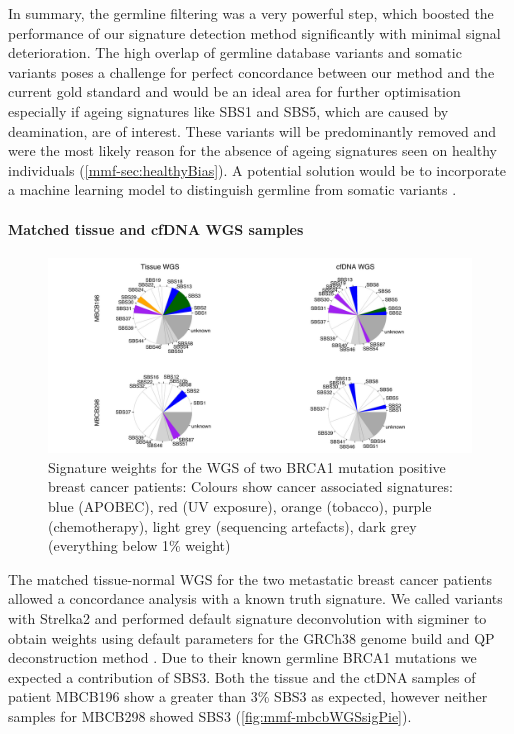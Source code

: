 In summary, the germline filtering was a very powerful step, which boosted the performance of our signature detection method significantly with minimal signal deterioration. The high overlap of germline database variants and somatic variants poses a challenge for perfect concordance between our method and the current gold standard and would be an ideal area for further optimisation especially if ageing signatures like SBS1 and SBS5, which are caused by deamination, are  of interest. These  variants will be predominantly removed and were the most likely reason for the absence of ageing signatures seen on healthy individuals (\autoref{mmf-sec:healthyBias}). A potential solution would be to incorporate a machine learning model to distinguish germline from somatic variants \cite{Spinella2016,Sahraeian2022}.

\paragraph{Matched tissue and cfDNA WGS samples}
\label{mmf-sec:matchedMBCB}

\begin{figure}[ht]
\centering
\includegraphics[width=.99\linewidth]{Figures/MisMatchFinder/mbcbWGSsignatures.pdf}
\caption[Signature weights for the WGS of two BRCA1 mutation positive breast cancer patients]{Signature weights for the WGS of two BRCA1 mutation positive breast cancer patients: Colours show cancer associated signatures: blue (APOBEC), red (UV exposure), orange (tobacco), purple (chemotherapy), light grey (sequencing artefacts), dark grey (everything below 1\% weight)}\label{fig:mmf-mbcbWGSsigPie}
\end{figure}
 
The matched tissue-normal WGS for the two metastatic breast cancer patients allowed a concordance analysis with a known truth signature. We called variants with Strelka2 and performed default signature deconvolution with sigminer to obtain weights using default parameters for the GRCh38 genome build and QP deconstruction method  \cite{Wang2021}. Due to their known germline BRCA1 mutations we expected a contribution of SBS3. Both the tissue and the ctDNA samples of patient MBCB196 show a greater than 3\% SBS3 as expected, however neither samples for MBCB298 showed SBS3 (\autoref{fig:mmf-mbcbWGSsigPie}).
 
